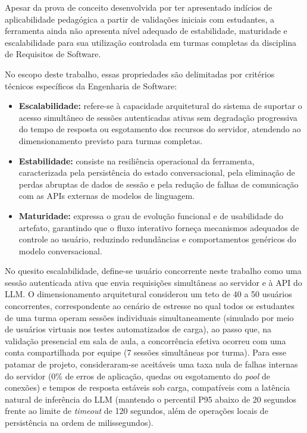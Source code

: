 Apesar da prova de conceito desenvolvida por  ter apresentado indícios de aplicabilidade pedagógica a partir de validações iniciais com estudantes, a ferramenta ainda não apresenta nível adequado de estabilidade, maturidade e escalabilidade para sua utilização controlada em turmas completas da disciplina de Requisitos de Software.

No escopo deste trabalho, essas propriedades são delimitadas por critérios técnicos específicos da Engenharia de Software:

\begin{itemize}
    \item \textbf{Escalabilidade:} refere-se à capacidade arquitetural do sistema de suportar o acesso simultâneo de sessões autenticadas ativas sem degradação progressiva do tempo de resposta ou esgotamento dos recursos do servidor, atendendo ao dimensionamento previsto para turmas completas.
    \item \textbf{Estabilidade:} consiste na resiliência operacional da ferramenta, caracterizada pela persistência do estado conversacional, pela eliminação de perdas abruptas de dados de sessão e pela redução de falhas de comunicação com as APIs externas de modelos de linguagem.
    \item \textbf{Maturidade:} expressa o grau de evolução funcional e de usabilidade do artefato, garantindo que o fluxo interativo forneça mecanismos adequados de controle ao usuário, reduzindo redundâncias e comportamentos genéricos do modelo conversacional.
\end{itemize}

No quesito escalabilidade, define-se usuário concorrente neste trabalho como uma sessão autenticada ativa que envia requisições simultâneas ao servidor e à API do LLM. O dimensionamento arquitetural considerou um teto de 40 a 50 usuários concorrentes, correspondente ao cenário de estresse no qual todos os estudantes de uma turma operam sessões individuais simultaneamente (simulado por meio de usuários virtuais nos testes automatizados de carga), ao passo que, na validação presencial em sala de aula, a concorrência efetiva ocorreu com uma conta compartilhada por equipe (7 sessões simultâneas por turma). Para esse patamar de projeto, consideraram-se aceitáveis uma taxa nula de falhas internas do servidor (0\% de erros de aplicação, quedas ou esgotamento do \textit{pool} de conexões) e tempos de resposta estáveis sob carga, compatíveis com a latência natural de inferência do LLM (mantendo o percentil P95 abaixo de 20 segundos frente ao limite de \textit{timeout} de 120 segundos, além de operações locais de persistência na ordem de milissegundos).

